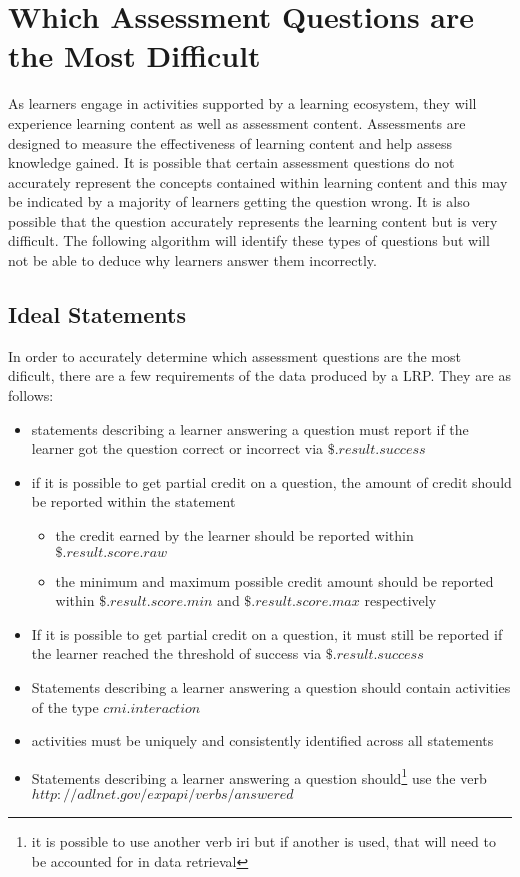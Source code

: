 \documentclass{article}
\begin{document}
\section{Which Assessment Questions are the Most Difficult}
As learners engage in activities supported by a learning ecosystem, they will
experience learning content as well as assessment content. Assessments
are designed to measure the effectiveness of learning content and help
assess knowledge gained. It is possible that certain assessment questions
do not accurately represent the concepts contained within learning
content and this may be indicated by a majority of learners getting
the question wrong. It is also possible that the question accurately
represents the learning content but is very difficult. The following
algorithm will identify these types of questions but will not be able to deduce
why learners answer them incorrectly.

\subsection{Ideal Statements}
In order to accurately determine which assessment questions are the
most dificult, there are a few requirements of the data produced by a
LRP. They are as follows:
\begin{itemize}
\item statements describing a learner answering a question must report
  if the learner got the question correct or incorrect via $\$.result.success$
\item if it is possible to get partial credit on a question, the amount
  of credit should be reported within the statement
  \begin{itemize}
  \item the credit earned by the learner should be reported within \\ $\$.result.score.raw$
  \item the minimum and maximum possible credit amount should be
    reported within $\$.result.score.min$ and $\$.result.score.max$
    respectively
  \end{itemize}
\item If it is possible to get partial credit on a question, it must
  still be reported if the learner reached the threshold of success
  via $\$.result.success$
\item Statements describing a learner answering a question should
  contain activities of the type $cmi.interaction$
\item activities must be uniquely and consistently identified across
  all statements
\item Statements describing a learner answering a question
  should\footnote{\label{verbIRI} it is possible to use another verb iri but if another is
    used, that will need to be accounted for in data retrieval} use
  the verb $http://adlnet.gov/expapi/verbs/answered$
\end{itemize}
\end{document}
